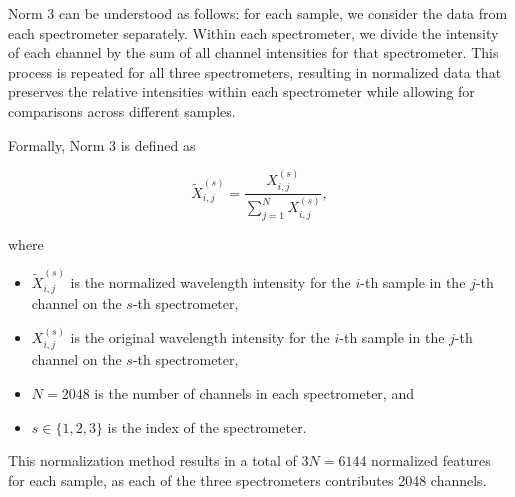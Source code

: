 Norm 3 can be understood as follows: for each sample, we consider the data from each spectrometer separately. Within each spectrometer, we divide the intensity of each channel by the sum of all channel intensities for that spectrometer. This process is repeated for all three spectrometers, resulting in normalized data that preserves the relative intensities within each spectrometer while allowing for comparisons across different samples.

Formally, Norm 3 is defined as

\begin{equation}
	\tilde{X}_{i,j}^{(s)} = \frac{X_{i,j}^{(s)}}{\sum_{j=1}^{N} X_{i,j}^{(s)}},
\end{equation}

where

\begin{itemize}
	\item $\tilde{X}_{i,j}^{(s)}$ is the normalized wavelength intensity for the $i$-th sample in the $j$-th channel on the $s$-th spectrometer,
	\item $X_{i,j}^{(s)}$ is the original wavelength intensity for the $i$-th sample in the $j$-th channel on the $s$-th spectrometer,
	\item $N = 2048$ is the number of channels in each spectrometer, and
	\item $s \in \{1, 2, 3\}$ is the index of the spectrometer.
\end{itemize}

This normalization method results in a total of $3N = 6144$ normalized features for each sample, as each of the three spectrometers contributes 2048 channels.
